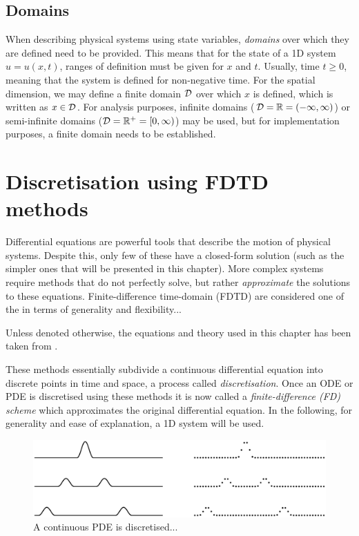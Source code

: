 \subsection{Domains}\label{sec:domains}
When describing physical systems using state variables, \textit{domains} over which they are defined need to be provided. This means that for the state of a 1D system $u = u(x,t)$, ranges of definition must be given for $x$ and $t$. Usually, time $t\geq 0$, meaning that the system is defined for non-negative time. For the spatial dimension, we may define a finite domain $\mathcal{D}$ over which $x$ is defined, which is written as $x\in \mathcal{D}$. For analysis purposes, infinite domains ($\mathcal{D} = \mathbb{R} = (-\infty, \infty)$) or semi-infinite domains ($\mathcal{D} = \mathbb{R}^+ = [0, \infty)$) may be used, but for implementation purposes, a finite domain needs to be established.

\section{Discretisation using FDTD methods}
Differential equations are powerful tools that describe the motion of physical systems. Despite this, only few of these have a closed-form \SWcomment[or analytical] solution (such as the simpler ones that will be presented in this chapter). More complex systems require methods that do not perfectly solve, but rather \textit{approximate} the solutions to these equations. Finite-difference time-domain (FDTD) are considered one of the
in terms of generality and flexibility... 

Unless denoted otherwise, the equations and theory used in this chapter has been taken from \cite{theBible}.


These methods essentially subdivide a continuous differential equation into discrete points in time and space, a process called \textit{discretisation}. Once an ODE or PDE is discretised using these methods it is now called a \textit{finite-difference (FD) scheme} which approximates the original differential equation. In the following, for generality and ease of explanation, a 1D system will be used.

\begin{figure}[h]
    \centering
    \includegraphics[width=\textwidth]{figures/fdtd/gridFigure.eps}
    \caption{\label{fig:discretisation} A continuous PDE is discretised... }
\end{figure}

